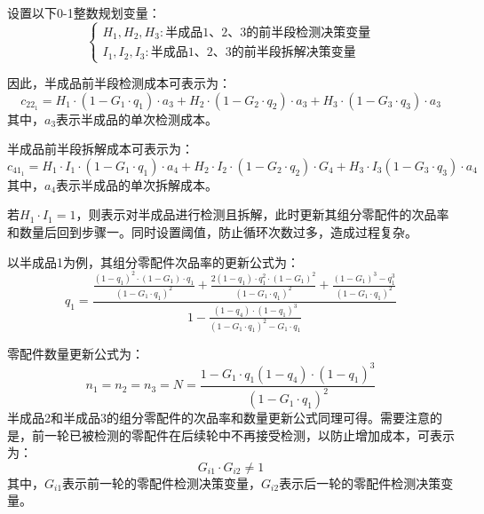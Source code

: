 \documentclass[withoutpreface,bwprint]{cumcmthesis} %
\begin{document}
设置以下0-1整数规划变量：
\begin{equation*}
	\left\{\begin{array}{l}
		H_1, H_2, H_3: \text{半成品1、2、3的前半段检测决策变量}\\
		I_1, I_2, I_3:\text{半成品1、2、3的前半段拆解决策变量}
	\end{array}\right.
\end{equation*}

因此，半成品前半段检测成本可表示为：
\begin{equation}
	c_{22_1}=H_1 \cdot\left(1-G_1 \cdot q_1\right) \cdot a_3+H_2 \cdot\left(1-G_2 \cdot q_2\right) \cdot a_3+H_3\cdot \left(1-G_3 \cdot q_3\right) \cdot a_3
\end{equation}
其中，$a_3$表示半成品的单次检测成本。

半成品前半段拆解成本可表示为：
\begin{equation}
	c_{41_1}=H_1 \cdot I_1 \cdot\left(1-G_1 \cdot q_1\right) \cdot a_4+H_2 \cdot I_2 \cdot\left(1-G_2 \cdot q_2\right) \cdot G_4+H_3 \cdot I_3\left(1-G_3 \cdot q_3\right) \cdot a_4
\end{equation}
其中，$a_4$表示半成品的单次拆解成本。

若$H_1\cdot I_1=1$，则表示对半成品进行检测且拆解，此时更新其组分零配件的次品率和数量后回到步骤一。同时设置阈值，防止循环次数过多，造成过程复杂。

以半成品1为例，其组分零配件次品率的更新公式为：
\begin{equation}
	q_1=\frac{\frac{\left(1-q_1\right)^2 \cdot\left(1-G_1\right) \cdot q_1}{\left(1-G_1 \cdot q_1\right)^2}+\frac{2\left(1-q_1\right) \cdot q_1^2 \cdot\left(1-G_1\right)^2}{\left(1-G_1 \cdot q_1\right)^2}+\frac{\left(1-G_1\right)^3-q_1^3}{\left(1-G_1 \cdot q_1\right)^2}}{1-\frac{\left(1-q_4\right) \cdot\left(1-q_1\right)^3}{\left(1-G_1 \cdot q_1\right)^2-G_1 \cdot q_1}}
\end{equation}

零配件数量更新公式为：
\begin{equation}
	n_1=n_2=n_3=N=\frac{1-G_1 \cdot q_1\left(1-q_4\right) \cdot\left(1-q_1\right)^3}{\left(1-G_1 \cdot q_1\right)^2}
\end{equation}
半成品2和半成品3的组分零配件的次品率和数量更新公式同理可得。需要注意的是，前一轮已被检测的零配件在后续轮中不再接受检测，以防止增加成本，可表示为：
\begin{equation}
	G_{i 1} \cdot G_{i 2} \neq 1
\end{equation}
其中，$G_{i1}$表示前一轮的零配件检测决策变量，$G_{i2}$表示后一轮的零配件检测决策变量。
\end{document}
